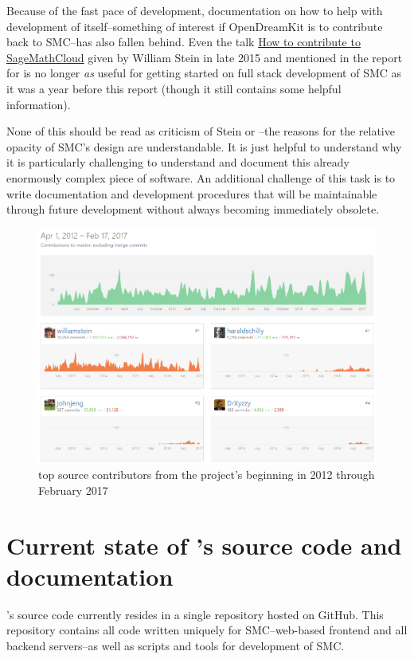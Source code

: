 \documentclass{deliverablereport}
\begin{document}
Because of the fast pace of development, documentation on how to help with
development of \SMC itself--something of interest if OpenDreamKit is to
contribute back to SMC--has also fallen behind.  Even the talk
\href{https://youtu.be/GOuy07Kift4}{How to contribute to SageMathCloud} given
by William Stein in late 2015 and mentioned in the report for 
is no longer \emph{as} useful for getting started on full stack development
of SMC as it was a year before this report (though it still contains some
helpful information).

None of this should be read as criticism of Stein or \SMC--the reasons for the
relative opacity of SMC's design are understandable.  It is just helpful to
understand why it is particularly challenging to understand and document this
already enormously complex piece of software.  An additional challenge of this
task is to write documentation and development procedures that will be
maintainable through future development without always becoming immediately
obsolete.

\begin{figure}
\includegraphics[width=\textwidth]{images/smc-contributions-2017-02-17.png}
\caption{top \SMC source contributors from the project's beginning in 2012 through February 2017}
\end{figure}

\section{Current state of \SMC's source code and documentation}

\SMC's source code currently resides in a single  repository
hosted on GitHub.  This repository contains all code written uniquely for
SMC--web-based frontend and all backend servers--as well as scripts and tools
for development of SMC.
\end{document}
